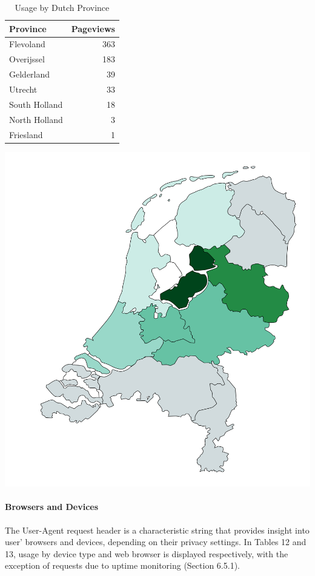 \documentclass{article}
\begin{document}
\begin{table}[!htb]
	\begin{minipage}{.5\linewidth}
		\caption{Usage by Dutch Province}
		\centering
		\begin{tabular}{lr}
			\hline
			\textbf{Province} & \textbf{Pageviews} \\
			\hline
			Flevoland         & 363                \\
			Overijssel        & 183                \\
			Gelderland        & 39                 \\
			Utrecht           & 33                 \\
			South Holland     & 18                 \\
			North Holland     & 3                  \\
			Friesland         & 1                  \\
			\hline
		\end{tabular}
	\end{minipage}%
	\hspace{.1cm}
	\begin{minipage}{.5\linewidth}
		\centering
		\centering
		\includegraphics[width=0.66\linewidth]{location-netherlands.png}
		\label{fig:test2}
	\end{minipage} 
\end{table}

\paragraph{Browsers and Devices} The User-Agent request header is a characteristic string that provides insight into user' browsers and devices, depending on their privacy settings. In Tables 12 and 13, usage by device type and web browser is displayed respectively, with the exception of requests due to uptime monitoring (Section 6.5.1). 
\end{document}
